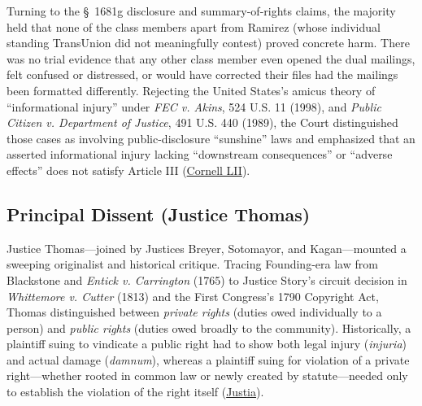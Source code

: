 \documentclass[12pt]{article}
\begin{document}
Turning to the \S~1681g disclosure and summary-of-rights claims, the majority held that none of the class members apart from Ramirez (whose individual standing TransUnion did not meaningfully contest) proved concrete harm. There was no trial evidence that any other class member even opened the dual mailings, felt confused or distressed, or would have corrected their files had the mailings been formatted differently. Rejecting the United States's amicus theory of ``informational injury'' under \textit{FEC v. Akins}, 524 U.S. 11 (1998), and \textit{Public Citizen v. Department of Justice}, 491 U.S. 440 (1989), the Court distinguished those cases as involving public-disclosure ``sunshine'' laws and emphasized that an asserted informational injury lacking ``downstream consequences'' or ``adverse effects'' does not satisfy Article III (\href{https://www.law.cornell.edu/supremecourt/text/20-297}{Cornell LII}).

\subsection{Principal Dissent (Justice Thomas)}

Justice Thomas---joined by Justices Breyer, Sotomayor, and Kagan---mounted a sweeping originalist and historical critique. Tracing Founding-era law from Blackstone and \textit{Entick v. Carrington} (1765) to Justice Story's circuit decision in \textit{Whittemore v. Cutter} (1813) and the First Congress's 1790 Copyright Act, Thomas distinguished between \textit{private rights} (duties owed individually to a person) and \textit{public rights} (duties owed broadly to the community). Historically, a plaintiff suing to vindicate a public right had to show both legal injury (\textit{injuria}) and actual damage (\textit{damnum}), whereas a plaintiff suing for violation of a private right---whether rooted in common law or newly created by statute---needed only to establish the violation of the right itself (\href{https://supreme.justia.com/cases/federal/us/594/20-297/}{Justia}).
\end{document}
